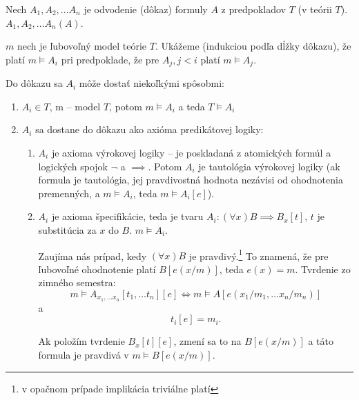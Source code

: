 \begin{dokaz}
    Nech $A_1, A_2, \ldots A_n$ je odvodenie (dôkaz) formuly $A$
    z predpokladov $T$ (v teórii $T$). $A_1, A_2, \ldots A_n(A)$. \fixme{}
    \par $m$ nech je ľubovoľný model teórie $T$.
    Ukážeme (indukciou podľa dĺžky dôkazu), že platí $m \models A_i$
    pri predpoklade, že pre $A_j, j < i$ platí $m \models A_j$.

    Do dôkazu sa $A_i$ môže dostať niekoľkými spôsobmi:
    \begin{enumerate}
    \item $A_i \in T$, m -- model $T$, potom $m \models A_i$ a teda
            $T \models A_i$
    \item $A_i$ sa dostane do dôkazu ako axióma predikátovej logiky:
        \begin{enumerate}
        \item $A_i$ je axioma výrokovej logiky -- je poskladaná z
        atomických formúl a logických spojok $\neg$ a $\implies$. Potom
        $A_i$ je tautológia výrokovej logiky (ak formula je tautológia,
        jej pravdivostná hodnota nezávisi od ohodnotenia premenných, a
        $m \models A_i$, teda $m \models A_i[e]$).

        \item $A_i$ je axioma špecifikácie, teda je tvaru $A_i: (\forall
        x) B \implies B_x[t]$, $t$ je substitúcia za $x$ do $B$. $m
        \models A_i$.
        \par
        Zaujíma nás prípad, kedy $(\forall x) B$ je pravdivý.\footnote{
            v opačnom prípade implikácia triviálne platí}
        To znamená, že pre ľubovoľné ohodnotenie platí $B[e(x/m)]$, teda
        $e(x)=m$. Tvrdenie zo zimného semestra: $$m \models A_{x_1,
        \ldots x_n}[t_1, \ldots t_n][e] \Leftrightarrow m \models
        A[e(x_1/m_1, \ldots x_n/m_n)]$$ a $$t_i[e] = m_i.$$ 

        Ak položím tvrdenie $B_x[t][e]$, zmení sa to na $B[e(x/m)]$ a
        táto formula je pravdivá v $m \models B[e(x/m)]$.


\end{enumerate}
\end{enumerate}
\end{dokaz}
